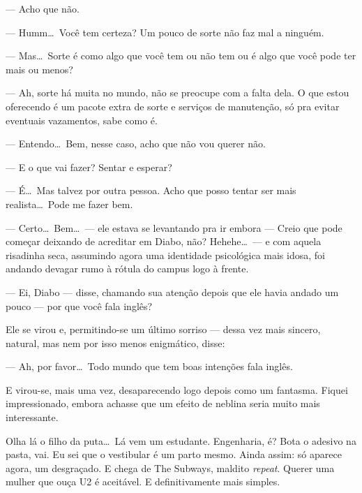 --- Acho que não.

--- Humm\ldots \ Você tem certeza? Um pouco de sorte não faz mal a ninguém.

--- Mas\ldots \ Sorte é como algo que você tem ou não tem ou é algo que você pode ter mais ou menos?

--- Ah, sorte há muita no mundo, não se preocupe com a falta dela. O que estou oferecendo é um pacote extra de sorte e serviços de manutenção, só pra evitar eventuais vazamentos, sabe como é.

--- Entendo\ldots \ Bem, nesse caso, acho que não vou querer não.

--- E o que vai fazer? Sentar e esperar?

--- É\ldots \ Mas talvez por outra pessoa. Acho que posso tentar ser mais realista\ldots \ Pode me fazer bem.

--- Certo\ldots \ Bem\ldots \ --- ele estava se levantando pra ir embora --- Creio que pode começar deixando de acreditar em Diabo, não? Hehehe\ldots \ --- e com aquela risadinha seca, assumindo agora uma identidade psicológica mais idosa, foi andando devagar rumo à rótula do campus logo à frente.

--- Ei, Diabo --- disse, chamando sua atenção depois que ele havia andado um pouco --- por que você fala inglês?

Ele se virou e, permitindo-se um último sorriso --- dessa vez mais sincero, natural, mas nem por isso menos enigmático, disse:

--- Ah, por favor\ldots \ Todo mundo que tem boas intenções fala inglês.

E virou-se, mais uma vez, desaparecendo logo depois como um fantasma. Fiquei impressionado, embora achasse que um efeito de neblina seria muito mais interessante.

Olha lá o filho da puta\ldots \ Lá vem um estudante. Engenharia, é? Bota o adesivo na pasta, vai. Eu sei que o vestibular é um parto mesmo. Ainda assim: só aparece agora, um desgraçado. E chega de The Subways, maldito \emph{repeat}. Querer uma mulher que ouça U2 é aceitável. E definitivamente mais simples.
